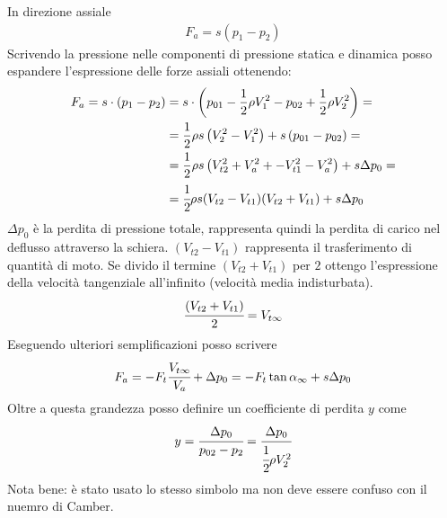 In direzione assiale
\begin{align*}
F_a = s (p_1 - p_2)
\end{align*}
Scrivendo la pressione nelle componenti di pressione statica e dinamica posso espandere l'espressione delle forze assiali ottenendo:
\begin{align*}
F_a = s \cdot ( p_1 - p_2) &= s \cdot \left( p_{01} - \frac{1}{2} \rho V_1^2 - p_{02} + \frac{1}{2} \rho V_2^2 \right) = \\
&= \frac{1}{2} \rho s \left( V_2^2 - V_1^2 \right) + s \left( p_{01} - p_{02} \right) = \\
&= \frac{1}{2} \rho s \left( V_{t2}^2 + V_a^2 + - V_{t1}^2- V_a^2 \right) + s \Delta p_0 =\\
&=\cfrac{1}{2} \rho s (V_{t2}-V_{t1}) (V_{t2}+V_{t1}) + s \Delta p_0
\end{align*}
$\Delta p_0$ è la perdita di pressione totale, rappresenta quindi la perdita di carico nel deflusso attraverso la schiera. $(V_{t2}-V_{t1})$ rappresenta il trasferimento di quantità di moto. Se divido il termine $(V_{t2}+V_{t1})$ per $2$ ottengo l'espressione della velocità tangenziale all'infinito (velocità media indisturbata).
\begin{align*}
\cfrac{(V_{t2}+V_{t1})}{2} = V_{t \infty}
\end{align*}
Eseguendo ulteriori semplificazioni posso scrivere
\begin{align*}
F_a = -F_t \cfrac{V_{t \infty}}{V_a} + \Delta p_0 = - F_t \tan \alpha_{\infty} + s \Delta p_0
\end{align*}
Oltre a questa grandezza posso definire un coefficiente di perdita $y$ come
\begin{align*}
y = \cfrac{\Delta p_0}{p_{02}-p_2} = \cfrac{\Delta p_0}{\cfrac{1}{2} \rho V_2^2}
\end{align*}
Nota bene: è stato usato lo stesso simbolo ma non deve essere confuso con il nuemro di Camber.

